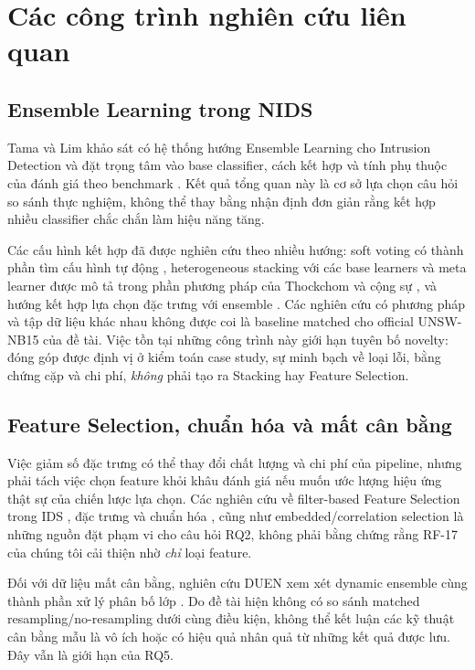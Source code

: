 \section{Các công trình nghiên cứu liên quan}
\label{chap:tong-quan}

\subsection{Ensemble Learning trong NIDS}
Tama và Lim khảo sát có hệ thống hướng Ensemble Learning cho Intrusion Detection và đặt trọng tâm vào base classifier, cách kết hợp và tính phụ thuộc của đánh giá theo benchmark \cite{legacyL01}. Kết quả tổng quan này là cơ sở lựa chọn câu hỏi so sánh thực nghiệm, không thể thay bằng nhận định đơn giản rằng kết hợp nhiều classifier chắc chắn làm hiệu năng tăng.

Các cấu hình kết hợp đã được nghiên cứu theo nhiều hướng: soft voting có thành phần tìm cấu hình tự động \cite{legacyL05}, heterogeneous stacking với các base learners và meta learner được mô tả trong phần phương pháp của Thockchom và cộng sự \cite{legacyL06}, và hướng kết hợp lựa chọn đặc trưng với ensemble \cite{legacyL04,legacyL12}. Các nghiên cứu có phương pháp và tập dữ liệu khác nhau không được coi là baseline matched cho official UNSW-NB15 của đề tài. Việc tồn tại những công trình này giới hạn tuyên bố novelty: đóng góp được định vị ở kiểm toán case study, sự minh bạch về loại lỗi, bằng chứng cặp và chi phí, \emph{không} phải tạo ra Stacking hay Feature Selection.

\subsection{Feature Selection, chuẩn hóa và mất cân bằng}
Việc giảm số đặc trưng có thể thay đổi chất lượng và chi phí của pipeline, nhưng phải tách việc chọn feature khỏi khâu đánh giá nếu muốn ước lượng hiệu ứng thật sự của chiến lược lựa chọn. Các nghiên cứu về filter-based Feature Selection trong IDS \cite{legacyL08}, đặc trưng và chuẩn hóa \cite{legacyL11}, cũng như embedded/correlation selection \cite{legacyL12} là những nguồn đặt phạm vi cho câu hỏi RQ2, không phải bằng chứng rằng RF-17 của chúng tôi cải thiện nhờ \emph{chỉ} loại feature.

Đối với dữ liệu mất cân bằng, nghiên cứu DUEN xem xét dynamic ensemble cùng thành phần xử lý phân bố lớp \cite{legacyL07}. Do đề tài hiện không có so sánh matched resampling/no-resampling dưới cùng điều kiện, không thể kết luận các kỹ thuật cân bằng mẫu là vô ích hoặc có hiệu quả nhân quả từ những kết quả được lưu. Đây vẫn là giới hạn của RQ5.

